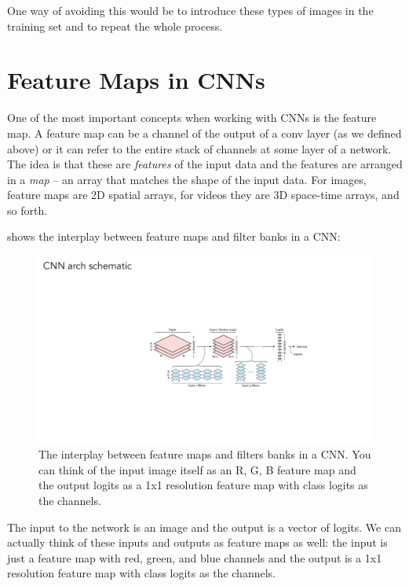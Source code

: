 One way of avoiding this would be to introduce these types of images in the training set and to repeat the whole process.


\section{Feature Maps in CNNs}

One of the most important concepts when working with CNNs is the feature map. A feature map can be a channel of the output of a conv layer (as we defined above) or it can refer to the entire stack of channels at some layer of a network. The idea is that these are \textit{features} of the input data and the features are arranged in a \textit{map} -- an array that matches the shape of the input data. For images, feature maps are 2D spatial arrays, for videos they are 3D space-time arrays, and so forth.

\Fig{\ref{fig:convolutional_neural_nets:feature_maps_schematic}} shows the interplay between feature maps and filter banks in a CNN:
\begin{figure}[h!]
\centerline{
\includegraphics[width=1.0\linewidth]{./figures/convolutional_neural_nets/feature_maps_schematic.pdf}}
\caption{The interplay between feature maps and filters banks in a CNN. You can think of the input image itself as an R, G, B feature map and the output logits as a 1x1 resolution feature map with class logits as the channels.}
\label{fig:convolutional_neural_nets:feature_maps_schematic}
\end{figure}

The input to the network is an image and the output is a vector of logits. We can actually think of these inputs and outputs as feature maps as well: the input is just a feature map with red, green, and blue channels and the output is a 1x1 resolution feature map with class logits as the channels. 

